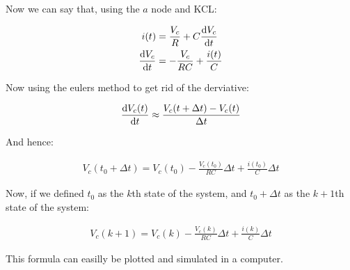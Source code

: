 \documentclass[11pt,a4paper]{book}
\begin{document}
Now we can say that, using the $a$ node and KCL:

\begin{align*}
i(t) &= \frac{V_c}{R} + C \frac{\text{d} V_c}{\text{d} t}\\
\frac{\text{d} V_c}{\text{d} t} &= - \frac{V_c}{RC} + \frac{i(t)}{C}
\end{align*}

Now using the eulers method to get rid of the derviative:

\begin{align*}
\frac{\text{d} V_c(t)}{\text{d} t} \approx \frac{V_c(t + \Delta t) - V_c(t)}{\Delta t}
\end{align*}

And hence:

\begin{align*}
V_c(t_0 + \Delta t) = V_c(t_0) - \frac{V_c(t_0)}{RC}\Delta t + \frac{i(t_0)}{C} \Delta t
\end{align*}

Now, if we defined $t_0$ as the $k$th state of the system, and $t_0 + \Delta t$ as the $k +1$th state of the system:

\begin{align*}
V_c(k + 1) = V_c(k) - \frac{V_c(k)}{RC} \Delta t + \frac{i(k)}{C} \Delta t
\end{align*}

This formula can easilly be plotted and simulated in a computer.
\end{document}
